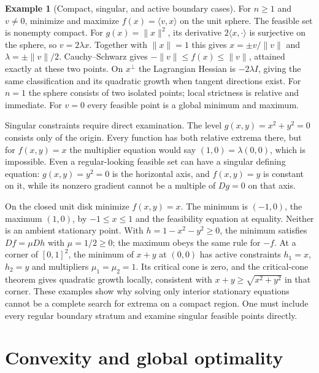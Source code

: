 \documentclass[11pt,oneside,openany]{book}
\theoremstyle{definition}
\newtheorem{example}[theorem]{Example}
\theoremstyle{remark}
\newcommand{\norm}[1]{\lVert#1\rVert}
\newcommand{\ip}[2]{\langle#1,#2\rangle}
\newcommand{\family}[1]{}
\begin{document}
\begin{example}[Compact, singular, and active boundary cases]\label{d04:05:worked-constraints}
For $n\geq1$ and $v\ne0$, minimize and maximize $f(x)=\ip{v}{x}$ on
the unit sphere. The feasible set is nonempty compact. For
$g(x)=\norm{x}^2$, its derivative $2\ip{x}{\cdot}$ is surjective on
the sphere, so $v=2\lambda x$. Together with $\norm{x}=1$ this gives
$x=\pm v/\norm{v}$ and $\lambda=\pm\norm{v}/2$.
Cauchy--Schwarz gives $-\norm{v}\leq f(x)\leq\norm{v}$, attained
exactly at these two points. On $x^\perp$ the Lagrangian Hessian is
$-2\lambda I$, giving the same classification and its quadratic growth
when tangent directions exist. For $n=1$ the sphere consists of two
isolated points; local strictness is relative and immediate. For $v=0$
every feasible point is a global minimum and maximum.

Singular constraints require direct examination. The level
$g(x,y)=x^2+y^2=0$ consists only of the origin. Every function has both
relative extrema there, but for $f(x,y)=x$ the multiplier equation would
say $(1,0)=\lambda(0,0)$, which is impossible. Even a regular-looking
feasible set can have a singular defining equation: $g(x,y)=y^2=0$
is the horizontal axis, and $f(x,y)=y$ is constant on it, while its
nonzero gradient cannot be a multiple of $Dg=0$ on that axis.

On the closed unit disk minimize $f(x,y)=x$. The minimum is $(-1,0)$,
the maximum $(1,0)$, by $-1\leq x\leq1$ and the feasibility equation
at equality. Neither is an ambient stationary point. With
$h=1-x^2-y^2\geq0$, the minimum satisfies
$Df=\mu Dh$ with $\mu=1/2\geq0$; the maximum obeys the same rule
for $-f$. At a corner of $[0,1]^2$, the minimum of $x+y$ at $(0,0)$
has active constraints $h_1=x$, $h_2=y$ and multipliers $\mu_1=\mu_2=1$.
Its critical cone is zero, and the critical-cone theorem gives quadratic
growth locally, consistent with $x+y\geq\sqrt{x^2+y^2}$ in that corner.
These examples show why solving only interior stationary equations cannot
be a complete search for extrema on a compact region. One must include
every regular boundary stratum and examine singular feasible points directly.
\end{example}

\section{Convexity and global optimality}
\family{K04.05.09}
\end{document}
